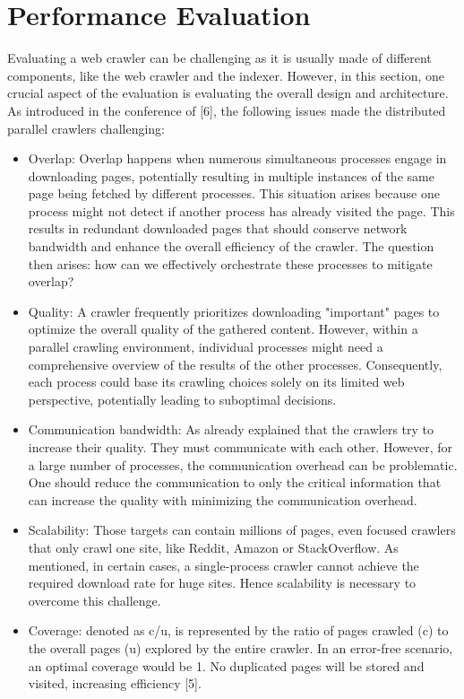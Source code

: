 \section{Performance Evaluation}
Evaluating a web crawler can be challenging as it is usually made of different components, like the web crawler and the indexer. However, in this section, one crucial aspect of the evaluation is evaluating the overall design and architecture. As introduced in the conference of [6], the following issues made the distributed parallel crawlers challenging:   

\begin{itemize}
  \item Overlap: Overlap happens when numerous simultaneous processes engage in downloading pages, potentially resulting in multiple instances of the same page being fetched by different processes. This situation arises because one process might not detect if another process has already visited the page. This results in redundant downloaded pages that should conserve network bandwidth and enhance the overall efficiency of the crawler. The question then arises: how can we effectively orchestrate these processes to mitigate overlap?
  \item Quality: A crawler frequently prioritizes downloading "important" pages to optimize the overall quality of the gathered content. However, within a parallel crawling environment, individual processes might need a comprehensive overview of the results of the other processes. Consequently, each process could base its crawling choices solely on its limited web perspective, potentially leading to suboptimal decisions.
  \item Communication bandwidth: As already explained that the crawlers try to increase their quality. They must communicate with each other. However, for a large number of processes, the communication overhead can be problematic. One should reduce the communication to only the critical information that can increase the quality with minimizing the communication overhead. 
  \item Scalability: Those targets can contain millions of pages, even focused crawlers that only crawl one site, like Reddit, Amazon or StackOverflow. As mentioned, in certain cases, a single-process crawler cannot achieve the required download rate for huge sites. Hence scalability is necessary to overcome this challenge.
  \item Coverage: denoted as c/u, is represented by the ratio of pages crawled (c) to the overall pages (u) explored by the entire crawler. In an error-free scenario, an optimal coverage would be 1. No duplicated pages will be stored and visited, increasing efficiency [5].
\end{itemize}
